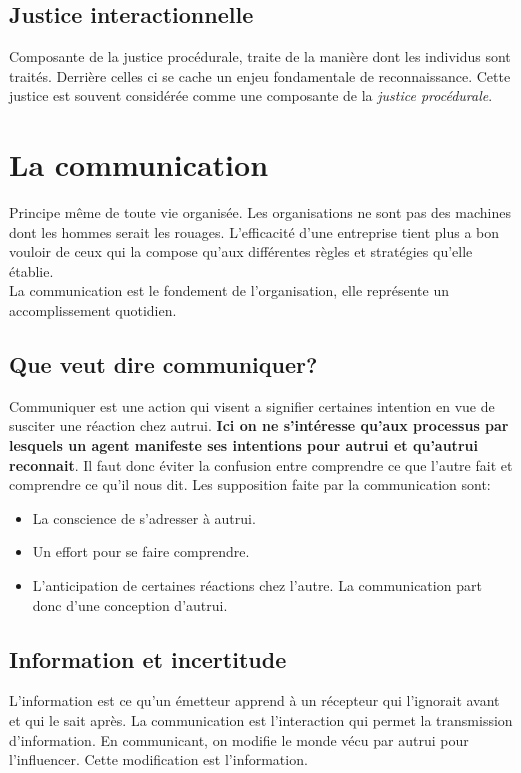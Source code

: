 \documentclass[11pt]{article} %
\begin{document}
	\subsection{Justice interactionnelle}
		Composante de la justice procédurale, traite de la manière dont les individus sont traités. Derrière celles ci se cache un enjeu fondamentale de reconnaissance. Cette justice est souvent considérée comme une composante de la \textit{justice procédurale}.





\section{La communication}
	Principe même de toute vie organisée. Les organisations ne sont pas des machines dont les hommes serait
	les rouages. L'efficacité d'une entreprise tient plus a bon vouloir de ceux qui la compose qu'aux différentes
	règles et stratégies qu'elle établie. \\
	La communication est le fondement de l'organisation, elle représente un accomplissement quotidien.




	\subsection{Que veut dire communiquer?}
		Communiquer est une action qui visent a signifier certaines intention en vue de susciter une réaction 
		chez autrui. \textbf{Ici on ne s'intéresse qu'aux processus par lesquels un agent manifeste ses 
		intentions pour autrui et qu'autrui reconnait}. Il faut donc éviter la confusion entre comprendre ce que 
		l'autre fait et comprendre ce qu'il nous dit. Les supposition faite par la communication sont:
		\begin{itemize}
			\item La conscience de s'adresser à autrui.
			\item Un effort pour se faire comprendre.
			\item L'anticipation de certaines réactions chez l'autre. La communication part donc d'une 
			conception d'autrui.
		\end{itemize}


	\subsection{Information et incertitude}
		L'information est ce qu'un émetteur apprend à un récepteur qui l'ignorait avant et qui le sait après. La
		communication est l'interaction qui permet la transmission d'information. En communicant, on modifie 
		le monde vécu par autrui pour l'influencer. Cette modification est l'information.
\end{document}

